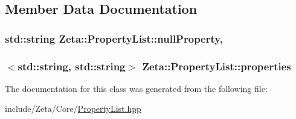\subsection{Member Data Documentation}
\hypertarget{classZeta_1_1PropertyList_a9b4b0e40bbe6e3f988a7c2c49574d0aa}{
\subsubsection[{null\+Property}]{\setlength{\rightskip}{0pt plus 5cm}std\+::string Zeta\+::\+Property\+List\+::null\+Property\hspace{0.3cm}{\ttfamily [static]}, {\ttfamily [private]}}}\label{classZeta_1_1PropertyList_a9b4b0e40bbe6e3f988a7c2c49574d0aa}
\hypertarget{classZeta_1_1PropertyList_aff0507b325954cc7419e4b6234a46a32}{
\subsubsection[{properties}]{$<$std\+::string, std\+::string$>$ Zeta\+::\+Property\+List\+::properties\hspace{0.3cm}{\ttfamily [private]}}}\label{classZeta_1_1PropertyList_aff0507b325954cc7419e4b6234a46a32}


The documentation for this class was generated from the following file\+:\begin{DoxyCompactItemize}
\item 
include/\+Zeta/\+Core/\hyperlink{PropertyList_8hpp}{Property\+List.\+hpp}\end{DoxyCompactItemize}
